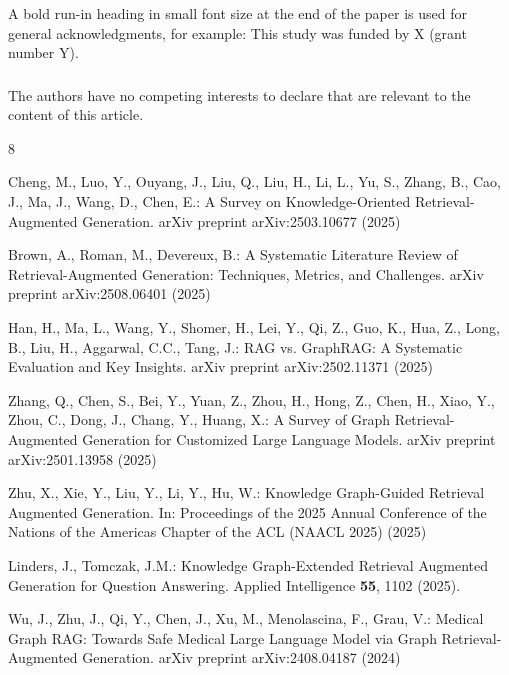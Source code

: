 \documentclass[runningheads]{llncs}
\begin{document}
\begin{credits}
\subsubsection{\ackname} A bold run-in heading in small font size at the end of the paper is
used for general acknowledgments, for example: This study was funded
by X (grant number Y).

\subsubsection{\discintname}
The authors have no competing interests to declare that are
relevant to the content of this article.
\end{credits}

\begin{thebibliography}{8}

Cheng, M., Luo, Y., Ouyang, J., Liu, Q., Liu, H., Li, L., Yu, S., Zhang, B., Cao, J., Ma, J., Wang, D., Chen, E.:
A Survey on Knowledge-Oriented Retrieval-Augmented Generation.
arXiv preprint arXiv:2503.10677 (2025)

Brown, A., Roman, M., Devereux, B.:
A Systematic Literature Review of Retrieval-Augmented Generation: Techniques, Metrics, and Challenges.
arXiv preprint arXiv:2508.06401 (2025)

Han, H., Ma, L., Wang, Y., Shomer, H., Lei, Y., Qi, Z., Guo, K., Hua, Z., Long, B., Liu, H., Aggarwal, C.C., Tang, J.:
RAG vs. GraphRAG: A Systematic Evaluation and Key Insights.
arXiv preprint arXiv:2502.11371 (2025)

Zhang, Q., Chen, S., Bei, Y., Yuan, Z., Zhou, H., Hong, Z., Chen, H., Xiao, Y., Zhou, C., Dong, J., Chang, Y., Huang, X.:
A Survey of Graph Retrieval-Augmented Generation for Customized Large Language Models.
arXiv preprint arXiv:2501.13958 (2025)

Zhu, X., Xie, Y., Liu, Y., Li, Y., Hu, W.:
Knowledge Graph-Guided Retrieval Augmented Generation.
In: Proceedings of the 2025 Annual Conference of the Nations of the Americas Chapter of the ACL (NAACL 2025) (2025)

Linders, J., Tomczak, J.M.:
Knowledge Graph-Extended Retrieval Augmented Generation for Question Answering.
Applied Intelligence \textbf{55}, 1102 (2025).

Wu, J., Zhu, J., Qi, Y., Chen, J., Xu, M., Menolascina, F., Grau, V.:
Medical Graph RAG: Towards Safe Medical Large Language Model via Graph Retrieval-Augmented Generation.
arXiv preprint arXiv:2408.04187 (2024)


\end{thebibliography}
\end{document}
